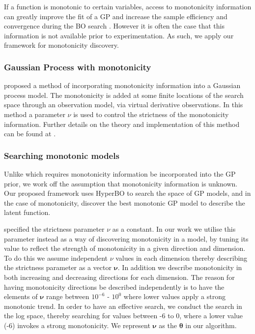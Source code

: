 If a function is monotonic to certain variables, access to monotonicity information can greatly improve the fit of a GP and increase the sample efficiency and convergence during the BO search \cite{Wang2018,Golchi2015,Li2018}. However it is often the case that this information is not available prior to experimentation. As such, we apply our framework for monotonicity discovery.

\subsubsection{Gaussian Process with monotonicity}

\cite{riihimaki2010gaussian} proposed a method of incorporating monotonicity information into a Gaussian process model. The monotonicity is added at some finite locations of the search space through an observation model, via virtual derivative observations. In this method a parameter $\nu$ is used to control the strictness of the monotonicity information. Further details on the theory and implementation of this method can be found at \cite{riihimaki2010gaussian}.

\subsubsection{Searching monotonic models}

Unlike \cite{riihimaki2010gaussian} which requires monotonicity information be incorporated into the GP prior, we work off the assumption that monotonicity information is unknown. Our proposed framework uses HyperBO to search the space of GP models, and in the case of monotonicity, discover the best monotonic GP model to describe the latent function. 

\cite{riihimaki2010gaussian} specified the strictness parameter $\nu$ as a constant. In our work we utilise this parameter instead as a way of discovering monotonicity in a model, by tuning its value to reflect the strength of monotonicity in a given direction and dimension.
To do this we assume independent $\nu$ values in each dimension thereby describing the strictness parameter as a vector $\boldsymbol{\nu}$. In addition we describe monotonicity in both increasing and decreasing directions for each dimension. The reason for having monotonicity directions be described independently is to have the elements of $\boldsymbol{\nu}$ range between $10^{-6}$ - $10^{0}$ where lower values apply a strong monotonic trend. In order to have an effective search, we conduct the search in the log space, thereby searching for values between -6 to 0, where a lower value (-6) invokes a strong monotonicity. We represent  $\boldsymbol{\nu}$ as the $\boldsymbol{\theta}$ in our algorithm. 

